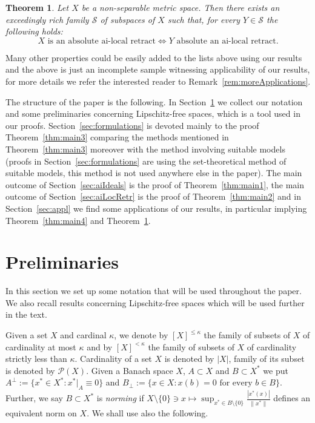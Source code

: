 \documentclass[11pt]{amsart}
\newtheorem{thmx}{Theorem}
\theoremstyle{definition}
\theoremstyle{remark}
\newcommand{\PP}{\mathcal P}
\newcommand{\SSS}{\mathcal S}
\begin{document}
\begin{thmx}\label{thm:main5}Let $X$ be a non-separable metric space. Then there exists an exceedingly rich family $\SSS$ of subspaces of $X$ such that, for every $Y\in \SSS$ the following holds:
\[
X \text{ is an absolute ai-local retract} \Leftrightarrow Y\text{ absolute an ai-local retract}.
\]
\end{thmx}
\noindent Many other properties could be easily added to the lists above using our results and the above is just an incomplete sample witnessing applicability of our results, for more details we refer the interested reader to Remark~\ref{rem:moreApplications}.

The structure of the paper is the following. In Section~\ref{sec:prelim} we collect our notation and some preliminaries concerning Lipschitz-free spaces, which is a tool used in our proofs. Section~\ref{sec:formulations} is devoted mainly to the proof Theorem~\ref{thm:main3} comparing the methods mentioned in Theorem~\ref{thm:main3} moreover with the method involving suitable models (proofs in Section~\ref{sec:formulations} are using the set-theoretical method of suitable models, this method is not used anywhere else in the paper). The main outcome of Section~\ref{sec:aiIdeals} is the proof of Theorem~\ref{thm:main1}, the main outcome of Section~\ref{sec:aiLocRetr} is the proof of Theorem~\ref{thm:main2} and in Section~\ref{sec:appl} we find some applications of our results, in particular implying Theorem~\ref{thm:main4} and Theorem~\ref{thm:main5}.

\section{Preliminaries}\label{sec:prelim}

In this section we set up some notation that will be used throughout the paper. We also recall results concerning Lipschitz-free spaces which will be used further in the text.

Given a set $X$ and cardinal $\kappa$, we denote by $[X]^{\leq \kappa}$ the family of subsets of $X$ of cardinality at most $\kappa$ and by $[X]^{< \kappa}$ the family of subsets of $X$ of cardinality strictly less than $\kappa$. Cardinality of a set $X$ is denoted by $|X|$, family of its subset is denoted by $\PP(X)$. Given a Banach space $X$, $A\subset X$ and $B\subset X^*$ we put $A^\perp:=\{x^*\in X^*\colon x^*|_A\equiv 0\}$ and $B_\perp:=\{x\in X\colon x(b)=0\text{ for every }b\in B\}$. Further, we say $B\subset X^*$ is \emph{norming} if $X\setminus\{0\} \ni x\mapsto \sup_{x^*\in B\setminus\{0\}} \tfrac{|x^*(x)|}{\|x^*\|}$ defines an equivalent norm on $X$. We shall use also the following.
\end{document}
